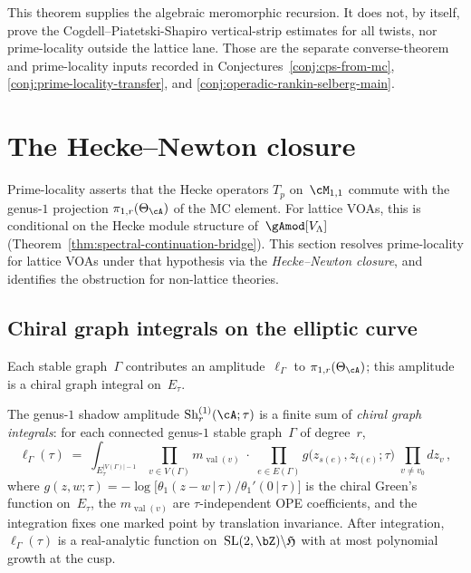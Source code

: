 This theorem supplies the algebraic meromorphic recursion. It does not,
by itself, prove the Cogdell--Piatetski-Shapiro vertical-strip estimates
for all twists, nor prime-locality outside the lattice lane. Those are
the separate converse-theorem and prime-locality inputs recorded in
Conjectures~\ref{conj:cps-from-mc},
\ref{conj:prime-locality-transfer}, and
\ref{conj:operadic-rankin-selberg-main}.



\section{The Hecke--Newton closure}%
\label{sec:hecke-newton-closure}%

Prime-locality asserts that the Hecke operators $T_p$
on~$\cM_{1,1}$ commute with the genus-$1$ projection
$\pi_{1,r}(\Theta_\cA)$ of the MC element. For lattice VOAs,
this is conditional on the Hecke module structure
of~$\gAmod[V_\Lambda]$
(Theorem~\ref{thm:spectral-continuation-bridge}).
This section resolves
prime-locality for lattice VOAs under that hypothesis via the
\emph{Hecke--Newton closure}, and identifies the
obstruction for non-lattice theories.

\subsection{Chiral graph integrals on the elliptic curve}

Each stable graph~$\Gamma$ contributes an
amplitude~$\ell_\Gamma$ to $\pi_{1,r}(\Theta_\cA)$;
this amplitude is a chiral graph integral on~$E_\tau$.

\begin{proposition}%
\label{prop:shadow-chiral-graph}%
\ClaimStatusConditional%
%
%
The genus-$1$ shadow amplitude
$\operatorname{Sh}_r^{(1)}(\cA;\tau)$ is a finite sum of
\emph{chiral graph integrals}: for each connected genus-$1$
stable graph~$\Gamma$ of degree~$r$,
\begin{equation}\label{eq:chiral-graph-integral}
 \ell_\Gamma(\tau)
 \;=\;
 \int_{E_\tau^{|V(\Gamma)|-1}}
 \prod_{v\in V(\Gamma)} m_{\operatorname{val}(v)}
 \;\cdot\;
 \prod_{e\in E(\Gamma)} g\!\bigl(z_{s(e)}, z_{t(e)};\tau\bigr)
 \;\prod_{v\ne v_0} dz_v\,,
\end{equation}
where $g(z,w;\tau) = -\log\bigl[\theta_1(z{-}w\,|\,\tau)/
\theta_1'(0\,|\,\tau)\bigr]$ is the chiral Green's function
on~$E_\tau$, the $m_{\operatorname{val}(v)}$ are
$\tau$-independent OPE coefficients, and the integration fixes
one marked point by translation invariance. After integration,
$\ell_\Gamma(\tau)$ is a real-analytic function
on~$\mathrm{SL}(2,\bZ)\backslash\mathfrak{H}$ with at most polynomial
growth at the cusp.
\end{proposition}

